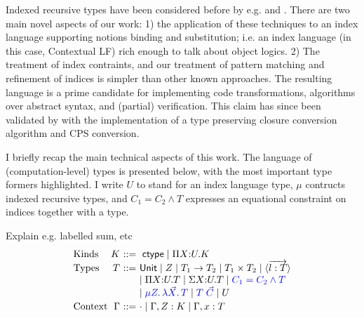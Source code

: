 \documentclass{article}
\newcommand{\LONGVERSION}[1]{{\color{light-gray}#1}}
\begin{document}
Indexed recursive types have been considered before
by e.g. \cite{Zenger:TCS97} and \cite{Xi99popl}. There are two main
novel aspects of our work:
1) the application of these techniques to an index language
supporting notions binding and substitution; i.e. an index language
(in this case, Contextual LF) rich enough to talk about object
logics. 2) The treatment of index contraints, and our treatment of
pattern matching and refinement of indices is simpler than other
known approaches. The resulting language is a prime candidate for
implementing code transformations, algorithms over abstract syntax,
and (partial) verification. This claim has since been validated by
\cite{Belanger13} with the implementation of a type preserving closure
conversion algorithm and CPS conversion.

I briefly recap the main technical aspects of this work. The
language of (computation-level) types is presented below, with the
most important type formers highlighted. I write $U$ to stand for an index
language type, $\mu$ contructs indexed recursive types, and $C_1 = C_2
\wedge T$ expresses an equational constraint on indices together with
a type.

\LONGVERSION{Explain e.g. labelled sum, etc}
\[
\begin{array}{l@{~}r@{~}c@{~}l}
%
\mbox{Kinds} & K & \bnfas & \ctype \bnfalt \pibox X U K \\

\mbox{Types} & T  & \bnfas & 
        \m{Unit} 
\bnfalt Z 
\bnfalt T_1 \arrow T_2   
\bnfalt  T_1 \times T_2 
\bnfalt \dsum{\wvec{l : T}} 
\\
& & &   
\bnfalt \pibox X U T 
\bnfalt \sigmabox X U T 
\bnfalt {\color{blue} C_1 = C_2 \andalso T}
\\
&&&    
 \bnfalt {\color{blue} \mu Z.\,\mlam {\vec X}  T}
 \bnfalt {\color{blue} T\;{\vec C} }
\bnfalt U
\\[2pt] %
\mbox{Context} & \Gamma & \bnfas & \cdot \bnfalt \Gamma, Z:K \bnfalt \Gamma, x:T
\end{array}
\]
\end{document}
